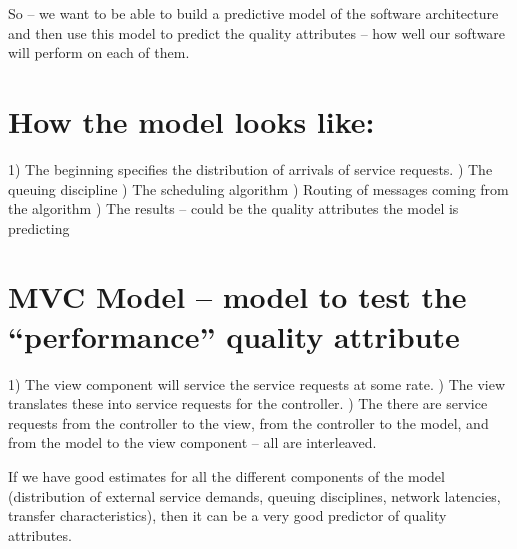 \documentclass[a4paper]{report}
\begin{document}
So – we want to be able to build a predictive model of the software architecture and then use this model to predict the quality attributes – how well our software will perform on each of them.

\section{How the model looks like:}
1)  The beginning specifies the distribution of arrivals of service requests. )  The queuing discipline )  The scheduling algorithm  )  Routing of messages coming from the algorithm  )  The results – could be the quality attributes the model is predicting \newline

\section{MVC Model – model to test the “performance” quality attribute}
1) The view component will service the service requests at some rate.  ) The view translates these into service requests for the controller.  ) The there are service requests from the controller to the view, from the controller to the model, and from the model to the view component – all are interleaved.  \newline

If we have good estimates for all the different components of the model (distribution of external service demands, queuing disciplines, network latencies, transfer characteristics), then it can be a very good predictor of quality attributes.
\end{document}
